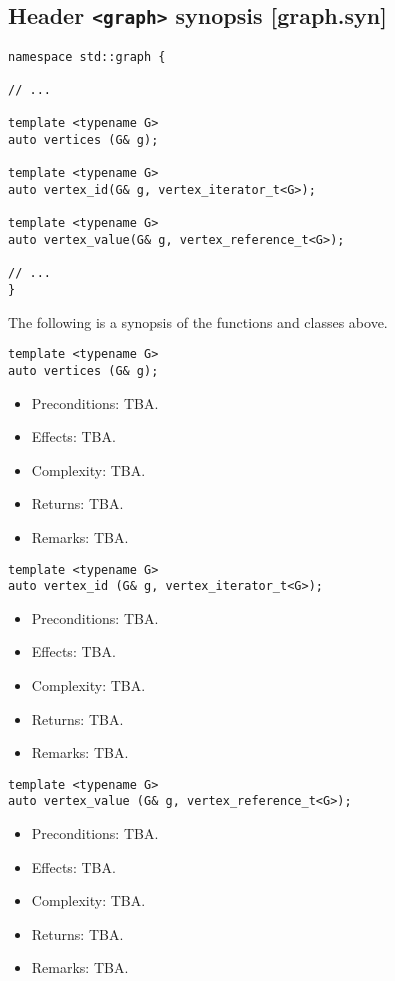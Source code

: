 \documentclass[10pt,onecolumn]{article}
\begin{document}
\subsection{Header \texttt{<graph>} synopsis [graph.syn]}

\begin{lstlisting}
namespace std::graph {

// ...

template <typename G>
auto vertices (G& g);

template <typename G>
auto vertex_id(G& g, vertex_iterator_t<G>);

template <typename G>
auto vertex_value(G& g, vertex_reference_t<G>);

// ...
}
\end{lstlisting}

\vspace{10pt}

\noindent The following is a synopsis of the functions and classes above.

\begin{lstlisting}
template <typename G>
auto vertices (G& g);
\end{lstlisting}
%
\begin{itemize}
\item Preconditions: TBA.
\item Effects: TBA.
\item Complexity: TBA.
\item Returns: TBA.
\item Remarks: TBA.
\end{itemize}

\vspace{10pt}

\begin{lstlisting}
template <typename G>
auto vertex_id (G& g, vertex_iterator_t<G>);
\end{lstlisting}
%
\begin{itemize}
\item Preconditions: TBA.
\item Effects: TBA.
\item Complexity: TBA.
\item Returns: TBA.
\item Remarks: TBA.
\end{itemize}

\vspace{10pt}

\begin{lstlisting}
template <typename G>
auto vertex_value (G& g, vertex_reference_t<G>);
\end{lstlisting}
%
\begin{itemize}
\item Preconditions: TBA.
\item Effects: TBA.
\item Complexity: TBA.
\item Returns: TBA.
\item Remarks: TBA.
\end{itemize}
\end{document}
